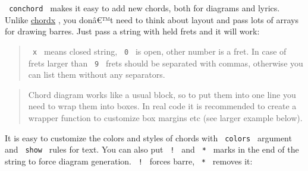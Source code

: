 \texttt{\ conchord\ } makes it easy to add new chords, both for diagrams
and lyrics. Unlike \href{https://github.com/ljgago/typst-chords}{chordx}
, you donâ€™t need to think about layout and pass lots of arrays for
drawing barres. Just pass a string with held frets and it will work:

\begin{Shaded}
\begin{Highlighting}[]


\end{Highlighting}
\end{Shaded}


\begin{quote}
\texttt{\ x\ } means closed string, \texttt{\ 0\ } is open, other number
is a fret. In case of frets larger than \texttt{\ 9\ } frets should be
separated with commas, otherwise you can list them without any
separators.
\end{quote}

\begin{quote}
Chord diagram works like a usual block, so to put them into one line you
need to wrap them into boxes. In real code it is recommended to create a
wrapper function to customize box margins etc (see larger example
below).
\end{quote}

It is easy to customize the colors and styles of chords with
\texttt{\ colors\ } argument and \texttt{\ show\ } rules for text. You
can also put \texttt{\ !\ } and \texttt{\ *\ } marks in the end of the
string to force diagram generation. \texttt{\ !\ } forces barre,
\texttt{\ *\ } removes it:

\begin{Shaded}
\begin{Highlighting}[]
\NormalTok{)}

\end{Highlighting}
\end{Shaded}


